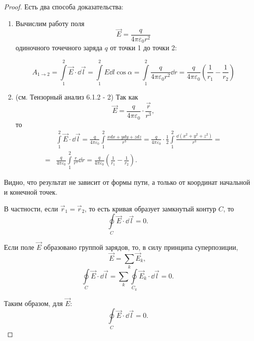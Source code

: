     \begin{proof}
        Есть два способа доказательства:
        \begin{enumerate}
            \item Вычислим работу поля
                \[
                    \vec{E} = \frac{q}{4\pi\varepsilon_0 r^2}
                \]
                одиночного точечного заряда \( q \) от точки 1 до точки 2:
                
                \[ 
                    A_{1\to2} = \int\limits_{1}^{2} \vec{E}\cdot\dd\vec{l} =
                    \int\limits_{1}^{2} E \dd l \cos\alpha =
                    \int\limits_{1}^{2} \frac{q}{4\pi\varepsilon_0 r^2}\dd r =
                    \frac{q}{4\pi\varepsilon_0}\left(\frac{1}{r_1} -
                    \frac{1}{r_2}\right)
                \]
            
            \item (см. Тензорный анализ 6.1.2 - 2)
                Так как 
                \[
                    \vec{E} = \frac{q}{4\pi\varepsilon_0}\cdot
                    \frac{\vec{r}}{r^3},
                \] 
                то
                \begin{align*}
                    & \int\limits_1^2 \vec{E}\cdot\dd\vec{l} =
                    \frac{q}{4\pi\varepsilon_0} \int\limits_1^2
                    \frac{xdx + ydy + zdz}{r^3} =
                    \frac{q}{4\pi\varepsilon_0}\cdot\frac{1}{2}\int\limits_1^2
                    \frac{\dd(x^2+y^2+z^2)}{r^3} = \\ = &
                    \frac{q}{4\pi\varepsilon_0} \int\limits_1^2 
                    \frac{r}{r^3}\dd r =
                    \frac{q}{4\pi\varepsilon_0}\left(\frac{1}{r_1} - 
                    \frac{1}{r_2}\right).
                \end{align*}
        \end{enumerate}
        Видно, что результат не зависит от формы пути, а только от 
        координат начальной и конечной точек.
        
        В частности, если \( \vec{r}_1 = \vec{r}_2 \), то есть кривая 
        образует замкнутый контур \( C \), то
        \[
            \oint\limits_C \vec{E}\cdot\dd\vec{l} = 0.
        \]
        
        Если поле \( \vec{E} \) образовано группой зарядов, то, в силу 
        принципа суперпозиции,
        \[ 
            \vec{E} = \sum\limits_k \vec{E}_{k},
        \]
        \[
            \oint\limits_C \vec{E}\cdot\dd\vec{l} =
            \sum\limits_k \oint\limits_{C_k}
            \vec{E}_{k}\cdot\dd\vec{l} = 0.
        \]
        
        Таким образом, для \( \vec{E} \):
        \[
            \oint\limits_C \vec{E}\cdot\dd\vec{l} = 0.
        \]
        
    \end{proof}
    
